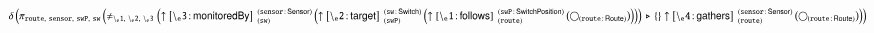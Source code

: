 \documentclass[varwidth=100cm,convert={density=120}]{standalone}
\begin{document}
\begin{preview}
$\duplicateelimination \left(\projection{\var{route},~\var{sensor},~\var{swP},~\var{sw}} \left(\alldifferent{\var{\backslash{}_e1},~\var{\backslash{}_e2},~\var{\backslash{}_e3}} \left(\expandout{\backslash{}_e3}{monitoredBy}{sw}{sensor}{Sensor} \left(\expandout{\backslash{}_e2}{target}{swP}{sw}{Switch} \left(\expandout{\backslash{}_e1}{follows}{route}{swP}{SwitchPosition} \left(\getvertices{route}{Route}\right)\right)\right)\right) \antijoin \{\} \expandout{\backslash{}_e4}{gathers}{route}{sensor}{Sensor} \left(\getvertices{route}{Route}\right)\right)\right)$
\end{preview}
\end{document}
